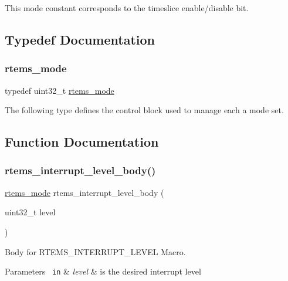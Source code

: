 This mode constant corresponds to the timeslice enable/disable bit. 

\subsection{Typedef Documentation}
\mbox{\label{group__ClassicModes_ga8d46a41a837840dc97336fdcd20e4f68}} 
\subsubsection{\texorpdfstring{rtems\_mode}{rtems\_mode}}
{\footnotesize\ttfamily typedef uint32\+\_\+t \mbox{\hyperlink{group__ClassicModes_ga8d46a41a837840dc97336fdcd20e4f68}{rtems\+\_\+mode}}}

The following type defines the control block used to manage each a mode set. 

\subsection{Function Documentation}
\mbox{\label{group__ClassicModes_ga5a9011dd2e307053b08b25aa7574b4f8}} 
\subsubsection{\texorpdfstring{rtems\_interrupt\_level\_body()}{rtems\_interrupt\_level\_body()}}
{\footnotesize\ttfamily \mbox{\hyperlink{group__ClassicModes_ga8d46a41a837840dc97336fdcd20e4f68}{rtems\+\_\+mode}} rtems\+\_\+interrupt\+\_\+level\+\_\+body (\begin{DoxyParamCaption}\item[{uint32\+\_\+t}]{level }\end{DoxyParamCaption})}



Body for R\+T\+E\+M\+S\+\_\+\+I\+N\+T\+E\+R\+R\+U\+P\+T\+\_\+\+L\+E\+V\+EL Macro. 


\begin{DoxyParams}[1]{Parameters}
\mbox{\texttt{ in}}  & {\em level} & is the desired interrupt level\\
\hline
\end{DoxyParams}

